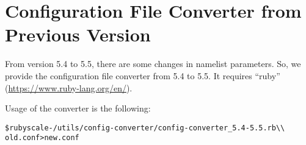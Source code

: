 \section{Configuration File Converter from Previous Version}

From version 5.4 to 5.5, there are some changes in namelist parameters.
So, we provide the configuration file converter from 5.4 to 5.5.
It requires ``ruby'' (\url{https://www.ruby-lang.org/en/}).

Usage of the converter is the following:\\
\begin{alltt}
 \$ ruby scale-{\version}/utils/config-converter/config-converter_5.4-5.5.rb \verb|\\|
        old.conf > new.conf
\end{alltt}
